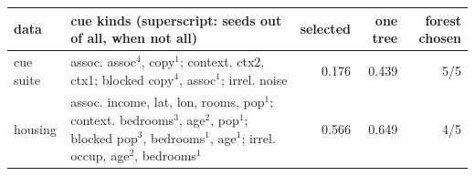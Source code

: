 \begin{tabular}{@{}lp{7.6cm}rrr@{}}\toprule
data & cue kinds (superscript: seeds out of all, when not all) & selected & one tree & forest chosen\\\midrule
cue suite & assoc. assoc$^{4}$, copy$^{1}$; context. ctx2, ctx1; blocked copy$^{4}$, assoc$^{1}$; irrel. noise & 0.176 & 0.439 & 5/5\\
housing & assoc. income, lat, lon, rooms, pop$^{1}$; context. bedrooms$^{3}$, age$^{2}$, pop$^{1}$; blocked pop$^{3}$, bedrooms$^{1}$, age$^{1}$; irrel. occup, age$^{2}$, bedrooms$^{1}$ & 0.566 & 0.649 & 4/5\\
\bottomrule\end{tabular}